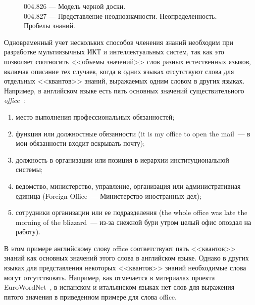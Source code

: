 \begin{multicols}{2}
\begin{figure*}
{\hspace*{2.5mm}\hspace*{50pt}004.826 --- Модель черной доски.\\
\hspace*{2.5mm}\hspace*{50pt}004.827 --- Представление неоднозначности. Неопределенность. Пробелы знаний.
}
\vspace*{3pt}
\vspace*{3pt}
\end{figure*}

      Одновременный учет нескольких способов членения знаний необходим при разработке
мульти\-языч\-ных ИКТ и интеллектуальных систем, так как это позволяет соотносить <<объемы
значений>> слов разных естественных языков, включая описание тех случаев, когда в одних
языках отсутствуют слова для отдельных <<квантов>> знаний, выражаемых одним словом в
других языках. Например, в английском языке есть пять основных значений существительного
\textit{office}~\cite{20za}:
      \begin{enumerate}[(1)]
\item место выполнения профессиональных обязанностей;\\[-7pt]
\item функция или должностные обязанности (it is my office to open the mail~--- в мои
обязанности входит вскрывать почту);\\[-7pt]
\item должность в организации или позиция в иерархии институциональной системы;\\[-7pt]
\item ведомство, министерство, управление, организация или административная
единица (Foreign Office~--- Министерство иностранных дел);\\[-7pt]
\item сотрудники организации или ее подразделения (the whole office was late the
morning of the blizzard~--- из-за снежной бури утром целый офис опоздал на работу).
      \end{enumerate}

      В этом примере английскому слову office соответствуют пять <<квантов>> знаний как
основных значений этого слова в английском языке. Однако в других языках для представления
некоторых <<квантов>> знаний необходимые слова могут отсутствовать. Например, как
отмечается в материалах проекта EuroWordNet~\cite{20za}, в испанском и итальянском
языках нет слов для выражения пятого значения в приведенном примере для слова office.


\end{multicols}
